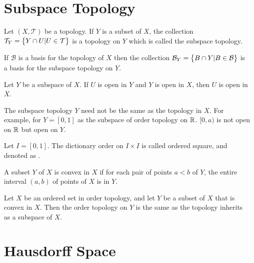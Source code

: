 \section{Subspace Topology}

\begin{definition}
    Let $(X, \mathcal{T})$ be a topology. If $Y$ is a subset of $X$, the collection $\mathcal{T}_{Y} = \set{Y \cap U | U \in \mathcal{T}}$ is a topology on $Y$ which is called the subspace topology.
\end{definition}

\begin{theorem}
    If $\mathcal{B}$ is a basis for the topology of $X$ then the collection $\mathcal{B}_Y = \set{B \cap Y | B \in \mathcal{B}}$ is a basis for the subspace topology on $Y$.
\end{theorem}

\begin{theorem}
    Let $Y$ be a subspace of $X$. If $U$ is open in $Y$ and $Y$ is open in $X$, then $U$ is open in $X$.    
\end{theorem}

The subspace topology $Y$ need not be the same as the topology in $X$. For example, for $Y=[0,1]$ as the subspace of order topology on $\mathbb{R}$. $[0,a)$ is not open on $\mathbb{R}$ but open on $Y$.

\begin{definition}
    Let $I=[0,1]$. The dictionary order on $I \times I$ is called ordered square, and denoted as . 
\end{definition}


\begin{theorem}
    A subset $Y$ of $X$ is convex in $X$ if for each pair of points $a < b$ of $Y$, the entire interval $(a,b)$ of points of $X$ is in $Y$.     
\end{theorem}

\begin{theorem}
    Let $X$ be an ordered set in order topology, and let $Y$ be a subset of $X$ that is convex in $X$. Then the order topology on $Y$ is the same as the topology inherits as a subspace of $X$.    
\end{theorem}






\section{Hausdorff Space}

